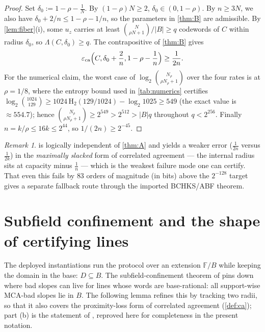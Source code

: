 \documentclass[11pt]{article}
\theoremstyle{definition}
\theoremstyle{remark}
\newtheorem{remark}[remark]{Remark}
\newcommand{\F}{\mathbb{F}}
\newcommand{\B}{B}
\newcommand{\eca}{\varepsilon_{\mathrm{ca}}}
\newcommand{\Lst}{\Lambda}
\newcommand{\Hb}{\mathrm{H}_2}
\begin{document}
\begin{proof}
Set $\delta_0:=1-\rho-\frac1N$. By $(1-\rho)N\ge2$, $\delta_0\in(0,1-\rho)$. By $n\ge3N$, we also have $\delta_0+2/n\le1-\rho-1/n$, so the parameters in \cref{thm:B} are admissible. By \cref{lem:fiber}(i), some $u_z$ carries at least $\binom N{\rho N+1}/|\B|\ge q$ codewords of $C$ within radius $\delta_0$, so $\Lst(C,\delta_0)\ge q$. The contrapositive of \cref{thm:B} gives
\[
\eca\Bigl(C,\delta_0+\frac2n,1-\rho-\frac1n\Bigr)\ge\frac1{2n}.
\]
For the numerical claim, the worst case of $\log_2\binom{N_\rho}{\rho N_\rho+1}$ over the four rates is at $\rho=1/8$, where the entropy bound used in \cref{tab:numerics} certifies $\log_2\binom{1024}{129}\ge1024\,\Hb(129/1024)-\log_2 1025\ge549$ (the exact value is $\approx554.7$); hence $\binom{N_\rho}{\rho N_\rho+1}\ge2^{549}>2^{512}>|\B|q$ throughout $q<2^{256}$. Finally $n=k/\rho\le16k\le2^{44}$, so $1/(2n)\ge2^{-45}$.
\end{proof}

\begin{remark}
 is logically independent of \cref{thm:A} and yields a weaker error ($\frac1{2n}$ versus $\frac1{2k}$) in the \emph{maximally slacked} form of correlated agreement --- the internal radius sits at capacity minus $\frac1n$ --- which is the weakest failure mode one can certify. That even this fails by $83$ orders of magnitude (in bits) above the $2^{-128}$ target gives a separate fallback route through the imported BCHKS/ABF theorem.
\end{remark}

\section{Subfield confinement and the shape of certifying lines}\label{sec:subfield}

The deployed instantiations run the protocol over an extension $\F/\B$ while keeping the domain in the base: $D\subseteq\B$. The subfield-confinement theorem of \cite[Thm.\ ``Subfield confinement'']{Cho26b} pins down where bad slopes can live for lines whose words are base-rational: all support-wise MCA-bad slopes lie in $\B$. The following lemma refines this by tracking two radii, so that it also covers the proximity-loss form of correlated agreement (\cref{def:ca}); part (b) is the statement of \cite{Cho26b}, reproved here for completeness in the present notation.
\end{document}
